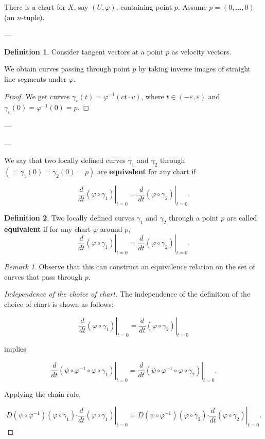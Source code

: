 \documentclass[11pt]{article}
\theoremstyle{definition}
\newtheorem{definition}{Definition}[section]
\theoremstyle{remark}
\newtheorem{remark}{Remark}[section]
\begin{document}
There is a chart for $X$, say $(U, \varphi)$, containing point $p$. Assume $p = (0, \dots, 0)$ (an $n$-tuple).

---

\begin{definition}\label{def:tangent_vectors}
Consider tangent vectors at a point \( p \) as velocity vectors.
\end{definition}

We obtain curves passing through point \( p \) by taking inverse images of straight line segments under \( \varphi \).

\begin{proof}
We get curves \( \gamma_v(t) = \varphi^{-1}(ct \cdot v) \), where \( t \in (-\varepsilon, \varepsilon) \) and \( \gamma_v(0) = \varphi^{-1}(0) = p \).
\end{proof}

---

---

We say that two locally defined curves $\gamma_1$ and $\gamma_2$
through $(=\gamma_1(0)=\gamma_2(0)=p)$ are \textbf{equivalent} for any chart if

\[
\left.\frac{d}{dt} (\varphi \circ \gamma_1)\right|_{t=0} = \left.\frac{d}{dt} (\varphi \circ \gamma_2)\right|_{t=0}.
\]

\begin{definition}\label{def:equivalent_curves}
Two locally defined curves $\gamma_1$ and $\gamma_2$ through a point $p$ are called \textbf{equivalent} if for any chart $\varphi$ around $p$,
\[
\left.\frac{d}{dt} (\varphi \circ \gamma_1)\right|_{t=0} = \left.\frac{d}{dt} (\varphi \circ \gamma_2)\right|_{t=0}.
\]
\end{definition}

\begin{remark}\label{rem:equivalence_relation}
Observe that this can construct an equivalence relation on the set of curves that pass through $p$.
\end{remark}

\begin{proof}[Independence of the choice of chart]
The independence of the definition of the choice of chart is shown as follows:

\[
\left.\frac{d}{dt} (\varphi \circ \gamma_1)\right|_{t=0} = \left.\frac{d}{dt} (\varphi \circ \gamma_2)\right|_{t=0}
\]

implies

\[
\left.\frac{d}{dt} (\psi \circ \varphi^{-1} \circ \varphi \circ \gamma_1)\right|_{t=0} = \left.\frac{d}{dt} (\psi \circ \varphi^{-1} \circ \varphi \circ \gamma_2)\right|_{t=0}.
\]

Applying the chain rule,

\[
D(\psi \circ \varphi^{-1})(\varphi \circ \gamma_1)\left.\cdot \frac{d}{dt} (\varphi \circ \gamma_1)\right|_{t=0} = D(\psi \circ \varphi^{-1})(\varphi \circ \gamma_2)\left.\cdot \frac{d}{dt} (\varphi \circ \gamma_2)\right|_{t=0}.
\]

\end{proof}
\end{document}
